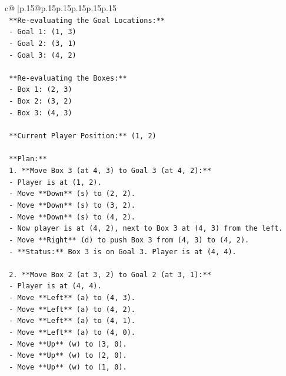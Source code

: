 \documentclass{article}
\begin{document}
{\begin{supertabular}{c@{$\;$}|p{.15\linewidth}@{}p{.15\linewidth}p{.15\linewidth}p{.15\linewidth}p{.15\linewidth}p{.15\linewidth}}
{{{\\ 
\texttt{    **Re{-}evaluating the Goal Locations:**} \\
\texttt{    {-} Goal 1: (1, 3)} \\
\texttt{    {-} Goal 2: (3, 1)} \\
\texttt{    {-} Goal 3: (4, 2)} \\
\\ 
\texttt{    **Re{-}evaluating the Boxes:**} \\
\texttt{    {-} Box 1: (2, 3)} \\
\texttt{    {-} Box 2: (3, 2)} \\
\texttt{    {-} Box 3: (4, 3)} \\
\\ 
\texttt{    **Current Player Position:** (1, 2)} \\
\\ 
\texttt{    **Plan:**} \\
\texttt{    1.  **Move Box 3 (at 4, 3) to Goal 3 (at 4, 2):**} \\
\texttt{        {-} Player is at (1, 2).} \\
\texttt{        {-} Move **Down** (s) to (2, 2).} \\
\texttt{        {-} Move **Down** (s) to (3, 2).} \\
\texttt{        {-} Move **Down** (s) to (4, 2).} \\
\texttt{        {-} Now player is at (4, 2), next to Box 3 at (4, 3) from the left.} \\
\texttt{        {-} Move **Right** (d) to push Box 3 from (4, 3) to (4, 2).} \\
\texttt{        {-} **Status:** Box 3 is on Goal 3. Player is at (4, 4).} \\
\\ 
\texttt{    2.  **Move Box 2 (at 3, 2) to Goal 2 (at 3, 1):**} \\
\texttt{        {-} Player is at (4, 4).} \\
\texttt{        {-} Move **Left** (a) to (4, 3).} \\
\texttt{        {-} Move **Left** (a) to (4, 2).} \\
\texttt{        {-} Move **Left** (a) to (4, 1).} \\
\texttt{        {-} Move **Left** (a) to (4, 0).} \\
\texttt{        {-} Move **Up** (w) to (3, 0).} \\
\texttt{        {-} Move **Up** (w) to (2, 0).} \\
\texttt{        {-} Move **Up** (w) to (1, 0).} \\
}}}
\end{supertabular}}
\end{document}
